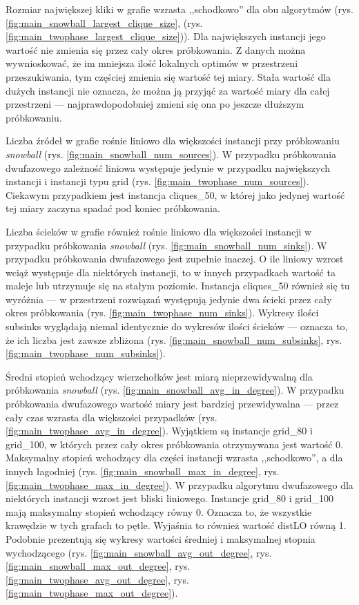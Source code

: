 Rozmiar największej kliki w grafie wzrasta ,,schodkowo'' dla obu algorytmów (rys. \ref{fig:main_snowball_largest_clique_size}, (rys. \ref{fig:main_twophase_largest_clique_size})).
Dla największych instancji jego wartość nie zmienia się przez cały okres próbkowania.
Z danych można wywnioskować, że im mniejsza ilość lokalnych optimów w przestrzeni przeszukiwania, tym częściej zmienia się wartość tej miary.
Stała wartość dla dużych instancji nie oznacza, że można ją przyjąć za wartość miary dla całej przestrzeni --- najprawdopodobniej zmieni się
ona po jeszcze dłuższym próbkowaniu.

Liczba źródeł w grafie rośnie liniowo dla większości instancji przy próbkowaniu \textit{snowball} (rys. \ref{fig:main_snowball_num_sources}).
W przypadku próbkowania dwufazowego zależność liniowa występuje jedynie w przypadku największych instancji i instancji typu grid (rys. \ref{fig:main_twophase_num_sources}).
Ciekawym przypadkiem jest instancja cliques\_50, w której jako jedynej wartość tej miary zaczyna spadać pod koniec próbkowania.

Liczba ścieków w grafie również rośnie liniowo dla większości instancji w przypadku próbkowania \textit{snowball} (rys. \ref{fig:main_snowball_num_sinks}).
W przypadku próbkowania dwufazowego jest zupełnie inaczej. O ile liniowy wzrost wciąż występuje dla niektórych instancji, to w innych przypadkach
wartość ta maleje lub utrzymuje się na stałym poziomie. Instancja cliques\_50 również się tu wyróżnia --- w przestrzeni rozwiązań występują jedynie dwa ścieki
przez cały okres próbkowania (rys. \ref{fig:main_twophase_num_sinks}).
Wykresy ilości subsinks wyglądają niemal identycznie do wykresów ilości ścieków --- oznacza to, że ich liczba jest zawsze zbliżona
(rys. \ref{fig:main_snowball_num_subsinks}, rys. \ref{fig:main_twophase_num_subsinks}).

Średni stopień wchodzący wierzchołków jest miarą nieprzewidywalną dla próbkowania \textit{snowball} (rys. \ref{fig:main_snowball_avg_in_degree}).
W przypadku próbkowania dwufazowego wartość miary jest bardziej przewidywalna --- przez cały czas wzrasta dla większości przypadków (rys. \ref{fig:main_twophase_avg_in_degree}).
Wyjątkiem są instancje grid\_80 i grid\_100, w których przez cały okres próbkowania otrzymywana jest wartość 0.
Maksymalny stopień wchodzący dla części instancji wzrasta ,,schodkowo'', a dla innych łagodniej (rys. \ref{fig:main_snowball_max_in_degree}, rys. \ref{fig:main_twophase_max_in_degree}).
W przypadku algorytmu dwufazowego dla niektórych instancji wzrost jest bliski liniowego.
Instancje grid\_80 i grid\_100 mają maksymalny stopień wchodzący równy 0.
Oznacza to, że wszystkie krawędzie w tych grafach to pętle. Wyjaśnia to również wartość distLO równą 1.
Podobnie prezentują się wykresy wartości średniej i maksymalnej stopnia wychodzącego
(rys. \ref{fig:main_snowball_avg_out_degree}, rys. \ref{fig:main_snowball_max_out_degree}, rys. \ref{fig:main_twophase_avg_out_degree}, rys. \ref{fig:main_twophase_max_out_degree}).

